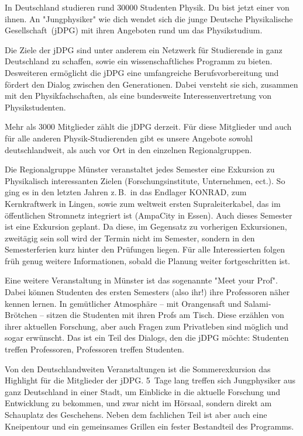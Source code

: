 \begin{multicols}{2}
In Deutschland studieren rund \num{30000} Studenten Physik.
Du bist jetzt einer von ihnen.
An "Jungphysiker" wie dich wendet sich die junge Deutsche Physikalische Gesellschaft~(jDPG) mit ihren Angeboten rund um das Physikstudium.

Die Ziele der jDPG sind unter anderem ein Netzwerk für Studierende in ganz Deutschland zu schaffen, sowie ein wissenschaftliches Programm zu bieten.
Desweiteren ermöglicht die jDPG eine umfangreiche Berufsvorbereitung und fördert den Dialog zwischen den Generationen.
Dabei versteht sie sich, zusammen mit den Physikfachschaften, als eine bundesweite Interessenvertretung von Physikstudenten.

Mehr als \num{3000} Mitglieder zählt die jDPG derzeit.
Für diese Mitglieder und auch für alle anderen Physik-Studierenden gibt es unsere Angebote sowohl deutschlandweit, als auch vor Ort in den einzelnen Regionalgruppen.

Die Regionalgruppe Münster veranstaltet jedes Semester eine Exkursion zu Physikalisch interessanten Zielen (Forschungsinstitute, Unternehmen, ect.).
So ging es in den letzten Jahren z.\,B.\ in das Endlager KONRAD, zum Kernkraftwerk in Lingen, sowie zum weltweit ersten Supraleiterkabel, das im öffentlichen Stromnetz integriert ist (AmpaCity in Essen).
Auch dieses Semester ist eine Exkursion geplant.
Da diese, im Gegensatz zu vorherigen Exkursionen, zweitägig sein soll wird der Termin nicht im Semester, sondern in den Semesterferien kurz hinter den Prüfungen liegen.
Für alle Interessierten folgen früh genug weitere Informationen, sobald die Planung weiter fortgeschritten ist.

Eine weitere Veranstaltung in Münster ist das sogenannte "Meet your Prof".
Dabei können Studenten des ersten Semesters (also ihr!) ihre Professoren näher kennen lernen.
In gemütlicher Atmosphäre -- mit Orangensaft und Salami-Brötchen -- sitzen die Studenten mit ihren Profs am Tisch.
Diese erzählen von ihrer aktuellen Forschung, aber auch Fragen zum Privatleben sind möglich und sogar erwünscht.
Das ist ein Teil des Dialogs, den die jDPG möchte: Studenten treffen Professoren, Professoren treffen Studenten.

Von den Deutschlandweiten Veranstaltungen ist die Sommerexkursion das Highlight für die Mitglieder der jDPG.
5~Tage lang treffen sich Jungphysiker aus ganz Deutschland in einer Stadt, um Einblicke in die aktuelle Forschung und Entwicklung zu bekommen, und zwar nicht im Hörsaal, sondern direkt am Schauplatz des Geschehens.
Neben dem fachlichen Teil ist aber auch eine Kneipentour und ein gemeinsames Grillen ein fester Bestandteil des Programms.


\end{multicols}
